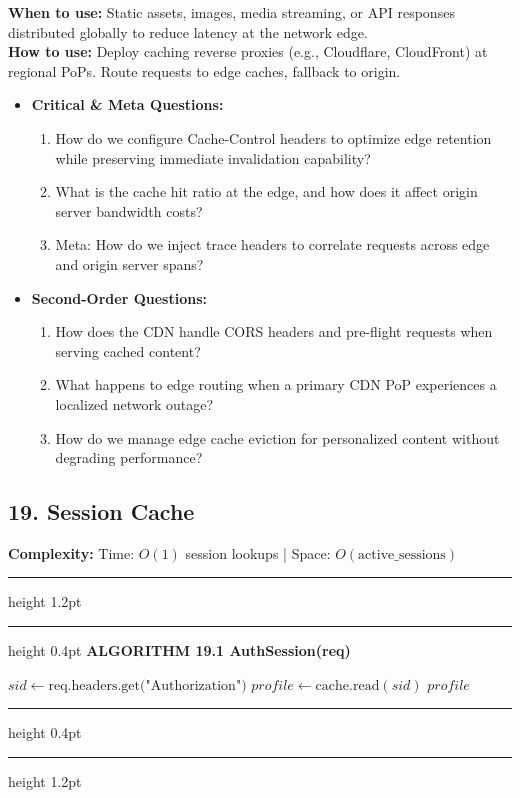 \documentclass[11pt,a4paper]{article}
\newenvironment{textbookalgo}[2]{%
  \par\addvspace{1.2em}\noindent
  \hrule height 1.2pt
  \vspace{1.5pt}
  \hrule height 0.4pt
  \vspace{5pt}
  {\noindent\large\bfseries\sffamily ALGORITHM #1 \quad #2}
  \par\vspace{5pt}
  \RestyleAlgo{plain}
}{%
  \par\vspace{4pt}
  \hrule height 0.4pt
  \vspace{1.5pt}
  \hrule height 1.2pt
  \par\addvspace{1.2em}
}
\theoremstyle{definition}
\begin{document}
\noindent
\textbf{When to use:} Static assets, images, media streaming, or API responses distributed globally to reduce latency at the network edge.\\
\textbf{How to use:} Deploy caching reverse proxies (e.g., Cloudflare, CloudFront) at regional PoPs. Route requests to edge caches, fallback to origin.
\begin{itemize}[leftmargin=*]
  \item[] \textbf{Critical \& Meta Questions:}
  \begin{enumerate}
  \item How do we configure Cache-Control headers to optimize edge retention while preserving immediate invalidation capability?
  \item What is the cache hit ratio at the edge, and how does it affect origin server bandwidth costs?
  \item Meta: How do we inject trace headers to correlate requests across edge and origin server spans?
  \end{enumerate}
  \item[] \textbf{Second-Order Questions:}
  \begin{enumerate}
  \item How does the CDN handle CORS headers and pre-flight requests when serving cached content?
  \item What happens to edge routing when a primary CDN PoP experiences a localized network outage?
  \item How do we manage edge cache eviction for personalized content without degrading performance?
  \end{enumerate}
\end{itemize}
\medskip

\clearpage
\subsection{19. Session Cache}

\noindent
\textbf{Complexity:} Time: $O(1)$ session lookups | Space: $O(\text{active\_sessions})$
\smallskip

\begin{textbookalgo}{19.1}{AuthSession(req)}
\begin{algorithm}[H]
$sid \leftarrow \text{req.headers.get("Authorization")}$\;
$profile \leftarrow \text{cache.read}(sid)$\;
\Return $profile$\;
\end{algorithm}
\end{textbookalgo}
\end{document}
